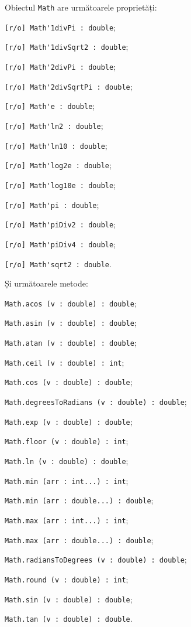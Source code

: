 Obiectul \lstinline|Math| are următoarele proprietăți:
\begin{icItems}
	\item \lstinline|[r/o] Math'1divPi : double|;
	\item \lstinline|[r/o] Math'1divSqrt2 : double|;
	\item \lstinline|[r/o] Math'2divPi : double|;
	\item \lstinline|[r/o] Math'2divSqrtPi : double|;
	\item \lstinline|[r/o] Math'e : double|;
	\item \lstinline|[r/o] Math'ln2 : double|;
	\item \lstinline|[r/o] Math'ln10 : double|;
	\item \lstinline|[r/o] Math'log2e : double|;
	\item \lstinline|[r/o] Math'log10e : double|;
	\item \lstinline|[r/o] Math'pi : double|;
	\item \lstinline|[r/o] Math'piDiv2 : double|;
	\item \lstinline|[r/o] Math'piDiv4 : double|;
	\item \lstinline|[r/o] Math'sqrt2 : double|.
\end{icItems}

Și următoarele metode:
\begin{icItems}
	\item \lstinline|Math.acos (v : double) : double|;
	\item \lstinline|Math.asin (v : double) : double|;
	\item \lstinline|Math.atan (v : double) : double|;
	\item \lstinline|Math.ceil (v : double) : int|;
	\item \lstinline|Math.cos (v : double) : double|;
	\item \lstinline|Math.degreesToRadians (v : double) : double|;
	\item \lstinline|Math.exp (v : double) : double|;
	\item \lstinline|Math.floor (v : double) : int|;
	\item \lstinline|Math.ln (v : double) : double|;
	\item \lstinline|Math.min (arr : int...) : int|;
	\item \lstinline|Math.min (arr : double...) : double|;
	\item \lstinline|Math.max (arr : int...) : int|;
	\item \lstinline|Math.max (arr : double...) : double|;
	\item \lstinline|Math.radiansToDegrees (v : double) : double|;
	\item \lstinline|Math.round (v : double) : int|;
	\item \lstinline|Math.sin (v : double) : double|;
	\item \lstinline|Math.tan (v : double) : double|.
\end{icItems}

